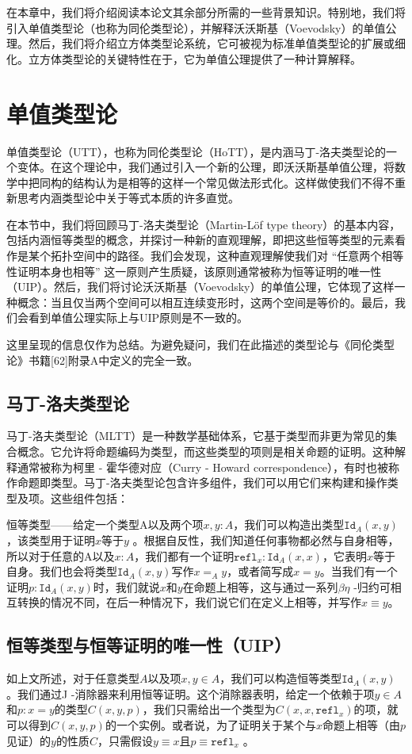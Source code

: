 \documentclass{ctexrep}
\theoremstyle{plain}
\theoremstyle{definition}
\theoremstyle{remark}
\begin{document}
在本章中，我们将介绍阅读本论文其余部分所需的一些背景知识。特别地，我们将引入单值类型论（也称为同伦类型论），并解释沃沃斯基（Voevodsky）的单值公理。然后，我们将介绍立方体类型论系统，它可被视为标准单值类型论的扩展或细化。立方体类型论的关键特性在于，它为单值公理提供了一种计算解释。 

\section{单值类型论}
单值类型论（UTT），也称为同伦类型论（HoTT），是内涵马丁-洛夫类型论的一个变体。在这个理论中，我们通过引入一个新的公理，即沃沃斯基单值公理，将数学中把同构的结构认为是相等的这样一个常见做法形式化。这样做使我们不得不重新思考内涵类型论中关于等式本质的许多直觉。 

在本节中，我们将回顾马丁-洛夫类型论（Martin-Löf type theory）的基本内容，包括内涵恒等类型的概念，并探讨一种新的直观理解，即把这些恒等类型的元素看作是某个拓扑空间中的路径。我们会发现，这种直观理解使我们对 “任意两个相等性证明本身也相等” 这一原则产生质疑，该原则通常被称为恒等证明的唯一性（UIP）。然后，我们将讨论沃沃斯基（Voevodsky）的单值公理，它体现了这样一种概念：当且仅当两个空间可以相互连续变形时，这两个空间是等价的。最后，我们会看到单值公理实际上与UIP原则是不一致的。 

这里呈现的信息仅作为总结。为避免疑问，我们在此描述的类型论与《同伦类型论》书籍[62]附录A中定义的完全一致。 

\subsection{马丁-洛夫类型论}
马丁-洛夫类型论（MLTT）是一种数学基础体系，它基于类型而非更为常见的集合概念。它允许将命题编码为类型，而这些类型的项则是相关命题的证明。这种解释通常被称为柯里 - 霍华德对应（Curry - Howard correspondence），有时也被称作命题即类型。马丁-洛夫类型论包含许多组件，我们可以用它们来构建和操作类型及项。这些组件包括： 

恒等类型——给定一个类型A以及两个项\(x,y:A\)，我们可以构造出类型\(\mathtt{Id}_{A}(x,y)\)，该类型用于证明\(x\)等于\(y\) 。根据自反性，我们知道任何事物都必然与自身相等，所以对于任意的A以及\(x:A\)，我们都有一个证明\(\mathtt{refl}_{x}:\mathtt{Id}_{A}(x,x)\)，它表明\(x\)等于自身。我们也会将类型\(\mathtt{Id}_{A}(x,y)\)写作\(x =_{A} y\)，或者简写成\(x = y\)。当我们有一个证明\(p:\mathtt{Id}_{A}(x,y)\)时，我们就说\(x\)和\(y\)在命题上相等，这与通过一系列\(\beta\eta\) -归约可相互转换的情况不同，在后一种情况下，我们说它们在定义上相等，并写作\(x \equiv y\)。

\subsection{恒等类型与恒等证明的唯一性（UIP）}
如上文所述，对于任意类型\(A\)以及项\(x,y\in A\)，我们可以构造恒等类型\(\mathtt{Id}_{A}(x,y)\)。我们通过J -消除器来利用恒等证明。这个消除器表明，给定一个依赖于项\(y\in A\)和\(p:x = y\)的类型\(C(x,y,p)\)，我们只需给出一个类型为\(C(x,x,\mathtt{refl}_{x})\)的项，就可以得到\(C(x,y,p)\)的一个实例。或者说，为了证明关于某个与\(x\)命题上相等（由\(p\)见证）的\(y\)的性质\(C\)，只需假设\(y\equiv x\)且\(p\equiv \mathtt{refl}_{x}\) 。 
\end{document}
